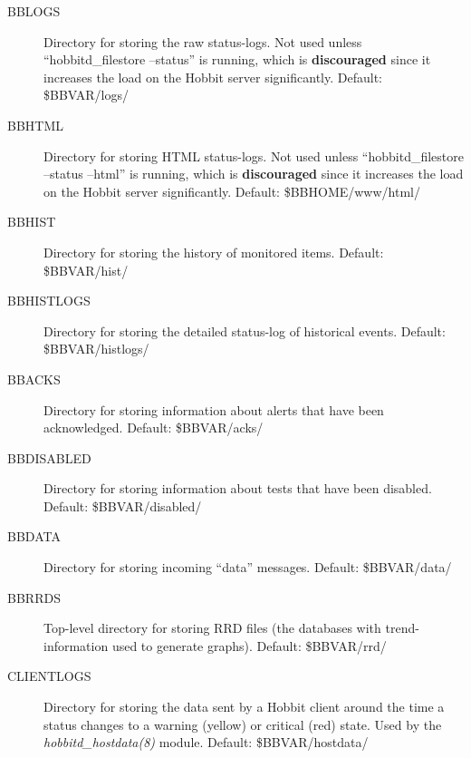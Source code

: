 \begin{description}
 

\item[BBLOGS] Directory for storing the raw status-logs. Not used unless ``hobbitd\_filestore --status'' is running, which is \textbf{discouraged}
 since it increases the load on the Hobbit server significantly. Default: \$BBVAR/logs/ 

 

\item[BBHTML] Directory for storing HTML status-logs. Not used unless ``hobbitd\_filestore --status --html'' is running, which is \textbf{discouraged}
 since it increases the load on the Hobbit server significantly. Default: \$BBHOME/www/html/ 

 

\item[BBHIST] Directory for storing the history of monitored items. Default: \$BBVAR/hist/ 

 

\item[BBHISTLOGS] Directory for storing the detailed status-log of historical events. Default: \$BBVAR/histlogs/ 

 

\item[BBACKS] Directory for storing information about alerts that have been acknowledged. Default: \$BBVAR/acks/ 

 

\item[BBDISABLED] Directory for storing information about tests that have been disabled. Default: \$BBVAR/disabled/ 

 

\item[BBDATA] Directory for storing incoming ``data'' messages. Default: \$BBVAR/data/ 

 

\item[BBRRDS] Top-level directory for storing RRD files (the databases with trend-information used to generate graphs). Default: \$BBVAR/rrd/ 

 

\item[CLIENTLOGS] Directory for storing the data sent by a Hobbit client around the time a status changes to a warning (yellow) or critical (red) state. Used by the \emph{hobbitd\_hostdata(8)}
 module. Default: \$BBVAR/hostdata/ 

 


 


\end{description}

